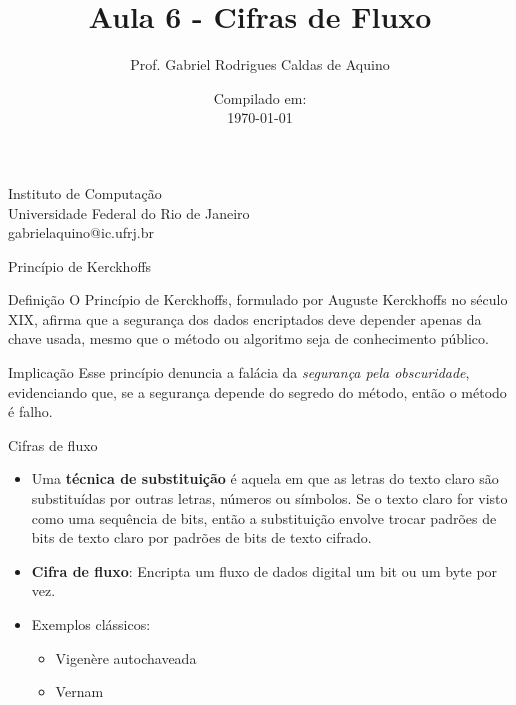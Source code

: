 \title{Aula 6 - Cifras de Fluxo}

\author{Prof. Gabriel Rodrigues Caldas de Aquino}

\institute
{
    Instituto de Computação \\
    Universidade Federal do Rio de Janeiro\\
    gabrielaquino@ic.ufrj.br%
}
\date{Compilado em: \\ \today} %




\begin{frame}
    \titlepage
\end{frame}

\begin{frame}{Princípio de Kerckhoffs}
    \begin{block}{Definição}
        O Princípio de Kerckhoffs, formulado por Auguste Kerckhoffs no século XIX, afirma que a segurança dos dados encriptados deve depender apenas da chave usada, mesmo que o método ou algoritmo seja de conhecimento público.
    \end{block}

    \begin{block}{Implicação}
        Esse princípio denuncia a falácia da \textit{segurança pela obscuridade}, evidenciando que, se a segurança depende do segredo do método, então o método é falho.
    \end{block}
\end{frame}



\begin{frame}{Cifras de fluxo}
    \begin{itemize}
        \item Uma \textbf{técnica de substituição} é aquela em que as letras do texto claro são substituídas por outras letras, números ou símbolos.  Se o texto claro for visto como uma sequência de bits, então a substituição envolve trocar
              padrões de bits de texto claro por padrões de bits de texto cifrado.
    \end{itemize}

    \begin{itemize}
        \item \textbf{Cifra de fluxo}: Encripta um fluxo de dados digital um bit ou um byte por vez.
        \item Exemplos clássicos:
              \begin{itemize}
                  \item Vigenère autochaveada
                  \item Vernam
              \end{itemize}
    \end{itemize}
\end{frame}

